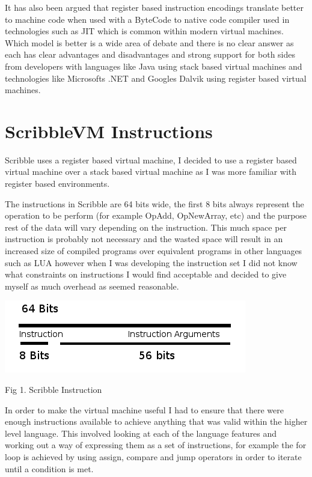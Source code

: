 \documentclass[]{final_report}
\begin{document}
It has also been argued that register based instruction encodings translate better to machine code when used with a ByteCode to native code compiler used in technologies such as JIT which is common within modern virtual machines. Which model is better is a wide area of debate and there is no clear answer as each has clear advantages and disadvantages and strong support for both sides from developers with languages like Java using stack based virtual machines and technologies like Microsofts .NET and Googles Dalvik using register based virtual machines.

\section{ScribbleVM Instructions}

Scribble uses a register based virtual machine, I decided to use a register based virtual machine over a stack based virtual machine as I was more familiar with register based environments.

The instructions in Scribble are 64 bits wide, the first 8 bits always represent the operation to be perform (for example OpAdd, OpNewArray, etc) and the purpose rest of the data will vary depending on the instruction. This much space per instruction is probably not necessary and the wasted space will result in an increased size of compiled programs over equivalent programs in other languages such as LUA however when I was developing the instruction set I did not know what constraints on instructions I would find acceptable and decided to give myself as much overhead as seemed reasonable.

\begin{center}
\includegraphics{"Instruction"}
\end{center}

Fig 1. Scribble Instruction

In order to make the virtual machine useful I had to ensure that there were enough instructions available to achieve anything that was valid within the higher level language. This involved looking at each of the language features and working out a way of expressing them as a set of instructions, for example the for loop is achieved by using assign, compare and jump operators in order to iterate until a condition is met. 
\end{document}
